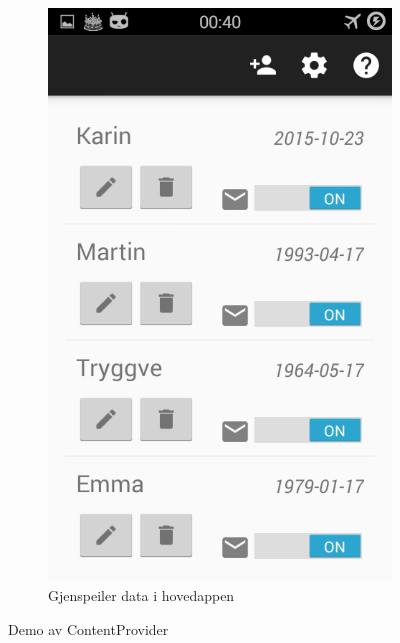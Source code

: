 \begin{figure}[ht]
\begin{subfigure}[b]{0.35\textwidth}
        \includegraphics[width=\textwidth]{./img/12.png}
        \caption{Gjenspeiler data i hovedappen}
        \label{fig:test_hovedapp}
    \end{subfigure}
    \caption{Demo av ContentProvider}
    \label{fig:content_provider}
\end{figure}




